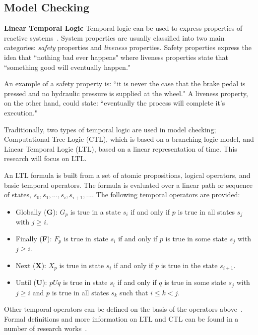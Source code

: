 \subsection{Model Checking}
\label{sec:modelchecking}

\textbf{Linear Temporal Logic}
Temporal logic can be used to express properties of reactive systems~\cite{Bozzano:2010:DSA:1951720}. System properties are usually classified into two main categories: {\em safety} properties and {\em liveness} properties. Safety properties express the idea that ``nothing bad ever happens" where liveness properties state that ``something good will eventually happen." 

An example of a safety property is: ``it is never the case that the brake pedal is pressed and no hydraulic pressure is supplied at the wheel." A liveness property, on the other hand, could state: ``eventually the process will complete it's execution." 

Traditionally, two types of temporal logic are used in model checking; Computational Tree Logic (CTL), which is based on a branching logic model, and Linear Temporal Logic (LTL), based on a linear representation of time. This research will focus on LTL. 

An LTL formula is built from a set of atomic propositions, logical operators, and basic temporal operators. The formula is evaluated over a linear path or sequence of states, $s_0, s_1, ..., s_i ,s_{i+1},...$. The following temporal operators are provided:
\begin{itemize}
    \item Globally (\textbf{G}): $G_p$ is true in a state $s_i$ if and only if $p$ is true in all states $s_j$ with $j \geq i$.
    
    \item Finally (\textbf{F}): $F_p$ is true in state $s_i$ if and only if $p$ is true in some state $s_j$ with $j \geq i$.
    
    \item Next (\textbf{X}): $X_p$ is true in state $s_i$ if and only if $p$ is true in the state $s_{i+1}$. 
    
    \item Until (\textbf{U}): $pUq$ is true in state $s_i$ if and only if $q$ is true in some state $s_j$ with $j \geq i$ and $p$ is true in all states $s_k$ such that $i \leq k < j$.
\end{itemize}

Other temporal operators can be defined on the basis of the operators above~\cite{sistla1985complexity}. Formal definitions and more information on LTL and CTL can be found in a number of research works~\cite{Bozzano:2010:DSA:1951720, clarke2018model}.